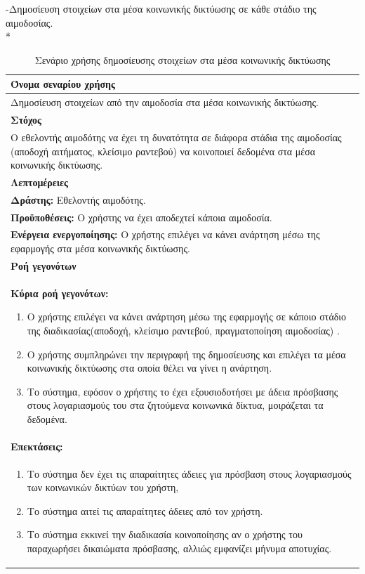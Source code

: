 \newpage
-Δημοσίευση στοιχείων στα μέσα κοινωνικής δικτύωσης σε κάθε στάδιο της αιμοδοσίας.
\\*
\begin{table}[H]	
	\begin{center}
	    \begin{tabular}{|p{\dimexpr \linewidth-2\tabcolsep}|}
	    \hline
	    \rowcolor{grayy}
	    \textbf{Όνομα σεναρίου χρήσης}
	    \\ \hline    
	    Δημοσίευση στοιχείων από την αιμοδοσία στα μέσα κοινωνικής δικτύωσης.
	     \\ \hline
	    \rowcolor{grayy}
	   \textbf{Στόχος}
	    \\ \hline
	 	 Ο εθελοντής αιμοδότης να έχει τη δυνατότητα σε διάφορα στάδια της αιμοδοσίας (αποδοχή αιτήματος, κλείσιμο ραντεβού) να κοινοποιεί δεδομένα στα μέσα κοινωνικής δικτύωσης.
	    \\ \hline
	    \rowcolor{grayy}
	    \textbf{Λεπτομέρειες}
	    \\ \hline
		\textbf{Δράστης:} Εθελοντής αιμοδότης.
		\\*
		\textbf{Προϋποθέσεις:} Ο χρήστης να έχει αποδεχτεί κάποια αιμοδοσία.
		\\*
		\textbf{Ενέργεια ενεργοποίησης:} Ο χρήστης επιλέγει να κάνει ανάρτηση μέσω της εφαρμογής στα μέσα κοινωνικής δικτύωσης.
		\\ \hline
		\rowcolor{grayy}    
	    \textbf{Ροή γεγονότων}
	    \\ \hline
		\textbf{Κύρια ροή γεγονότων:}
		\begin{enumerate}
		\item	 Ο χρήστης επιλέγει να κάνει ανάρτηση μέσω της εφαρμογής σε κάποιο στάδιο της διαδικασίας(αποδοχή, κλείσιμο ραντεβού, πραγματοποίηση αιμοδοσίας) .
		\item Ο χρήστης συμπληρώνει την περιγραφή της δημοσίευσης και επιλέγει τα μέσα κοινωνικής δικτύωσης στα οποία θέλει να γίνει η ανάρτηση.
	   \item Το σύστημα, εφόσον ο χρήστης το έχει εξουσιοδοτήσει με άδεια πρόσβασης στους λογαριασμούς του στα ζητούμενα κοινωνικά δίκτυα, μοιράζεται τα δεδομένα.
		\end{enumerate}
		\\ \hline
		\rowcolor{grayy}
		\textbf{Επεκτάσεις:}
		   \\ \hline
		\begin{enumerate}
			\item Το σύστημα δεν έχει τις απαραίτητες άδειες για πρόσβαση στους λογαριασμούς των κοινωνικών δικτύων του χρήστη,
			\item Το σύστημα αιτεί τις απαραίτητες άδειες από τον χρήστη.
			\item Το σύστημα εκκινεί την διαδικασία κοινοποίησης αν ο χρήστης του παραχωρήσει δικαιώματα πρόσβασης, αλλιώς εμφανίζει μήνυμα αποτυχίας.
		\end{enumerate}
		\\ \hline
	    \end{tabular}
	    \caption{Σενάριο χρήσης δημοσίευσης στοιχείων στα μέσα κοινωνικής δικτύωσης}
	    \label{tab:share_to_social_media} 
	\end{center}
\end{table}		

